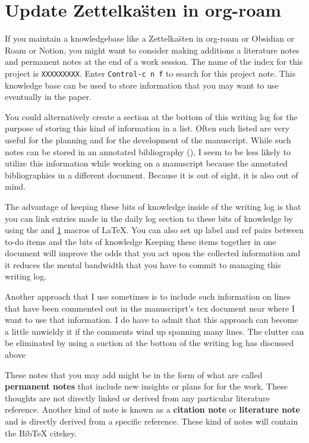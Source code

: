 \documentclass[10pt,letterpaper]{article}
\begin{document}
\section{Update Zettelka\"sten in org-roam}
If you maintain a knowledgebase like a Zettelka\"sten in org-roam or Obsidian or Roam or Notion, you might want to consider making additions a literature notes and permanent notes at the end of a work session.
The name of the index for this project is \verb|XXXXXXXXX|.
Enter \texttt{Control-c n f} to search for this project note.
This knowledge base can be used to store information that you may want to use eventually in the paper.

You could alternatively create a section at the bottom of this writing log for the purpose of storing this kind of information in a list.
Often such listed are very useful for the planning and for the development of the manuscript.
While such notes can be stored in an annotated bibliography (), I seem to be less likely to utilize this information while working on a manuscript because the annotated bibliographies in a different document.
Because it is out of sight, it is also out of mind.

The advantage of keeping these bits of knowledge inside of the writing log is that you can link entries made in the daily log section to these bits of knowledge by using the \label{} and \ref{} macros of LaTeX.
You can also set up label and ref pairs between to-do items and the bits of knowledge
Keeping these items together in one document will improve the odds that you act upon the collected information and it reduces the mental bandwidth that you have to commit to managing this writing log.

Another approach that I use sometimes is to include such information on lines that have been commented out in the manuscriprt's tex document near where I want to use that information.
I do have to admit that this approach can become a little unwieldy it if the comments wind up spanning many lines.
The clutter can be eliminated by using a suction at the bottom of the writing log has discussed above



These notes that you may add might be in the form of what are called \textbf{permanent notes} that include new insights or plans for for the work.
These thoughts are not directly linked or derived from any particular literature reference.
Another kind of note is known as a \textbf{citation note} or \textbf{literature note} and is directly derived from a specific reference.
These kind of notes will contain the BibTeX citekey.
\end{document}
